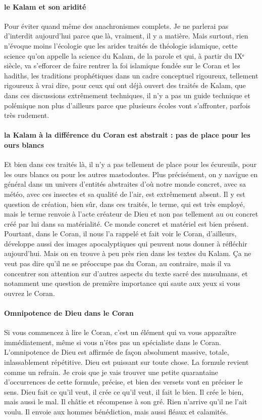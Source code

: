 \paragraph{le Kalam et son aridité}
Pour éviter quand même des anachronismes complets. Je ne parlerai pas d'interdit aujourd'hui parce que là, vraiment, il y a matière. Mais surtout, rien n'évoque moins l'écologie que les arides traités de théologie islamique, cette science qu'on appelle la science du Kalam, de la parole et qui, à partir du IXᵉ siècle, va s'efforcer de faire rentrer la foi islamique fondée sur le Coran et les hadiths, les traditions prophétiques dans un cadre conceptuel rigoureux, tellement rigoureux à vrai dire, pour ceux qui ont déjà ouvert des traités de Kalam, que dans ces discussions extrêmement techniques, il n'y a pas un guide technique et polémique non plus d'ailleurs parce que plusieurs écoles vont s'affronter, parfois très rudement. 

\paragraph{la Kalam à la différence du Coran est abstrait :  pas de place pour les ours blancs}Et bien dans
ces traités là, il n'y a pas tellement de place pour les écureuils, pour les ours blancs ou pour les autres mastodontes. Plus précisément, on y navigue en général dans un univers d'entités abstraites d'où notre monde concret, avec sa météo, avec ces insectes et sa qualité de l'air, est extrêmement absent. Il y est question de création, bien sûr, dans ces traités, le terme, qui est très employé, mais le terme renvoie à l'acte créateur de Dieu et non pas tellement au ou concret créé par lui dans sa matérialité.
Ce monde concret et matériel est bien présent. Pourtant, dans le Coran, il nous l'a rappelé et fait voir le Coran, d'ailleurs, développe aussi des images apocalyptiques qui peuvent nous donner à réfléchir aujourd'hui. Mais on en trouve à peu près rien dans les textes du Kalam. Ça ne veut pas dire qu'il ne se préoccupe pas du Coran, au contraire, mais il va concentrer son attention sur d'autres aspects du texte sacré des musulmans, et notamment une question de première importance qui saute aux yeux si vous ouvrez le Coran.

\paragraph{Omnipotence de Dieu dans le Coran} Si vous commencez à lire le Coran, c'est un élément qui va vous apparaître immédiatement, même si vous n'êtes pas un spécialiste dans le Coran.
L'omnipotence de Dieu est affirmée de façon absolument massive, totale, inlassablement répétitive. Dieu est puissant sur toute chose. La formule revient comme un refrain. Je crois que je vais trouver une petite quarantaine d'occurrences de cette formule, précise, et bien des versets vont en préciser le sens. Dieu fait ce qu'il veut, il crée ce qu'il veut, il fait le bien.
Il crée le bien, mais aussi le mal. Il châtie et récompense à son gré. Rien n'arrive qu'il ne l'ait voulu.  Il envoie aux hommes bénédiction, mais aussi fléaux et calamités.
